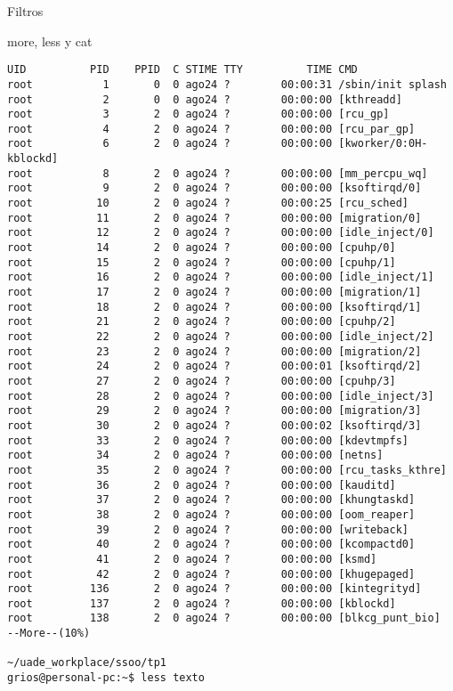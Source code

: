 \begin{section}{Filtros}
\begin{subsection}{more, less y cat}
\begin{lstlisting}[style=Ubuntu]
UID          PID    PPID  C STIME TTY          TIME CMD
root           1       0  0 ago24 ?        00:00:31 /sbin/init splash
root           2       0  0 ago24 ?        00:00:00 [kthreadd]
root           3       2  0 ago24 ?        00:00:00 [rcu_gp]
root           4       2  0 ago24 ?        00:00:00 [rcu_par_gp]
root           6       2  0 ago24 ?        00:00:00 [kworker/0:0H-kblockd]
root           8       2  0 ago24 ?        00:00:00 [mm_percpu_wq]
root           9       2  0 ago24 ?        00:00:00 [ksoftirqd/0]
root          10       2  0 ago24 ?        00:00:25 [rcu_sched]
root          11       2  0 ago24 ?        00:00:00 [migration/0]
root          12       2  0 ago24 ?        00:00:00 [idle_inject/0]
root          14       2  0 ago24 ?        00:00:00 [cpuhp/0]
root          15       2  0 ago24 ?        00:00:00 [cpuhp/1]
root          16       2  0 ago24 ?        00:00:00 [idle_inject/1]
root          17       2  0 ago24 ?        00:00:00 [migration/1]
root          18       2  0 ago24 ?        00:00:00 [ksoftirqd/1]
root          21       2  0 ago24 ?        00:00:00 [cpuhp/2]
root          22       2  0 ago24 ?        00:00:00 [idle_inject/2]
root          23       2  0 ago24 ?        00:00:00 [migration/2]
root          24       2  0 ago24 ?        00:00:01 [ksoftirqd/2]
root          27       2  0 ago24 ?        00:00:00 [cpuhp/3]
root          28       2  0 ago24 ?        00:00:00 [idle_inject/3]
root          29       2  0 ago24 ?        00:00:00 [migration/3]
root          30       2  0 ago24 ?        00:00:02 [ksoftirqd/3]
root          33       2  0 ago24 ?        00:00:00 [kdevtmpfs]
root          34       2  0 ago24 ?        00:00:00 [netns]
root          35       2  0 ago24 ?        00:00:00 [rcu_tasks_kthre]
root          36       2  0 ago24 ?        00:00:00 [kauditd]
root          37       2  0 ago24 ?        00:00:00 [khungtaskd]
root          38       2  0 ago24 ?        00:00:00 [oom_reaper]
root          39       2  0 ago24 ?        00:00:00 [writeback]
root          40       2  0 ago24 ?        00:00:00 [kcompactd0]
root          41       2  0 ago24 ?        00:00:00 [ksmd]
root          42       2  0 ago24 ?        00:00:00 [khugepaged]
root         136       2  0 ago24 ?        00:00:00 [kintegrityd]
root         137       2  0 ago24 ?        00:00:00 [kblockd]
root         138       2  0 ago24 ?        00:00:00 [blkcg_punt_bio]
--More--(10%)

~/uade_workplace/ssoo/tp1
grios@personal-pc:~$ less texto


\end{lstlisting}
\end{subsection}
\end{section}
